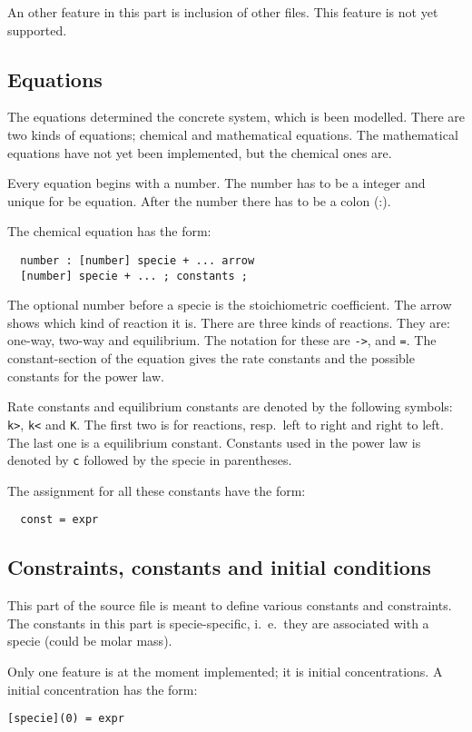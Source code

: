 An other feature in this part is inclusion of other files. This feature is not yet 
supported.

\subsection{Equations}
The equations determined the concrete system, which is been modelled. There are two
kinds of equations; chemical and mathematical equations. The mathematical equations
have not yet been implemented, but the chemical ones are.

Every equation begins with a number. The number has to be a integer and unique for be 
equation. After the number there has to be a colon (:). 

The chemical equation has the form:
\begin{verbatim}
  number : [number] specie + ... arrow 
  [number] specie + ... ; constants ;
\end{verbatim}

The optional number before a specie is the stoichiometric coefficient. The arrow
shows which kind of reaction it is. There are three kinds of reactions. They are:
one-way, two-way and equilibrium. The notation for these are {\tt ->}, {\tt <->}
and {\tt =}. The constant-section of the equation gives the rate constants and
the possible constants for the power law. 

Rate constants and equilibrium constants are denoted by the following symbols:
{\tt k>}, {\tt k<} and {\tt K}. The first two is for reactions, resp.~left to right
and right to left. The last one is a equilibrium constant. Constants used in the power
law is denoted by {\tt c} followed by the specie in parentheses. 

The assignment for all these constants have the form:
\begin{verbatim}
  const = expr
\end{verbatim}

\subsection{Constraints, constants and initial conditions}
This part of the source file is meant to define various constants and constraints. The constants
in this part is specie-specific, i.~e.~they are associated with a specie (could be molar mass).

Only one feature is at the moment implemented; it is initial concentrations. A initial concentration
has the form:
\begin{verbatim}
[specie](0) = expr
\end{verbatim}

